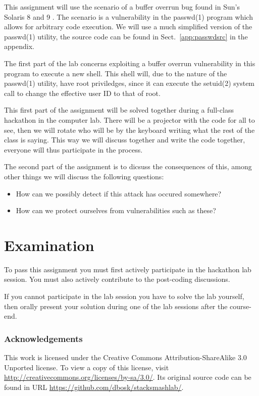 This assignment will use the scenario of a buffer overrun bug found in Sun's 
Solaris 8 and 9 \cite{passwdbug}.
The scenario is a vulnerability in the passwd(1) program which allows for 
arbitrary code execution.
We will use a much simplified version of the passwd(1) utility, the source code 
can be found in Sect.~\ref{app:passwdsrc} in the appendix.

The first part of the lab concerns exploiting a buffer overrun vulnerability in 
this program to execute a new shell.
This shell will, due to the nature of the passwd(1) utility, have root 
priviledges, since it can execute the setuid(2) system call to change the 
effective user ID to that of root.

This first part of the assignment will be solved together during a full-class 
hackathon in the computer lab.
There will be a projector with the code for all to see, then we will rotate who 
will be by the keyboard writing what the rest of the class is saying.
This way we will discuss together and write the code together, everyone will 
thus participate in the process.

The second part of the assignment is to dicsuss the consequences of this, among 
other things we will discuss the following questions:
\begin{itemize}
  \item How can we possibly detect if this attack has occured somewhere?
  \item How can we protect ourselves from vulnerabilities such as these?
\end{itemize}


\section{Examination}
\label{sec:exam}
To pass this assignment you must first actively participate in the hackathon 
lab session.
You must also actively contribute to the post-coding discussions.

If you cannot participate in the lab session you have to solve the lab 
yourself, then orally present your solution during one of the lab sessions 
after the course-end.


\subsubsection*{Acknowledgements}

This work is licensed under the Creative Commons Attribution-ShareAlike 3.0 
Unported license.
To view a copy of this license, visit 
\url{http://creativecommons.org/licenses/by-sa/3.0/}.
Its original source code can be found in URL 
\url{https://github.com/dbosk/stacksmashlab/}.


